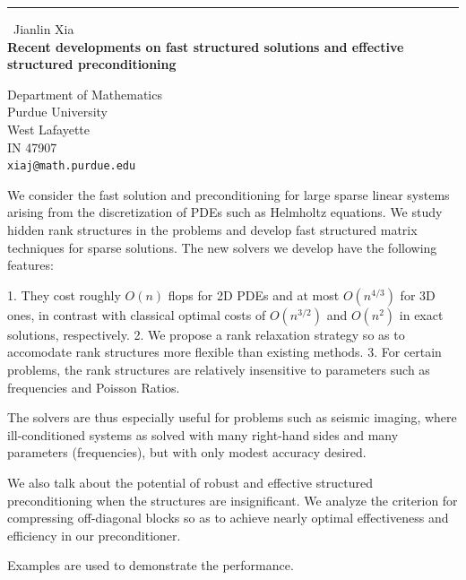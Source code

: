 \documentclass{report}
\begin{document}
\begin{center}
\rule{6in}{1pt} \
{\large Jianlin Xia \\
{\bf Recent developments on fast structured solutions and effective structured preconditioning}}

Department of Mathematics \\ Purdue University \\ West Lafayette \\ IN 47907
\\
{\tt xiaj@math.purdue.edu}\end{center}

We consider the fast solution and preconditioning for large
sparse linear systems arising from the discretization of PDEs
such as Helmholtz equations. We study hidden rank structures
in the problems and develop fast structured matrix techniques
for sparse solutions. The new solvers we develop have the
following features:

1. They cost roughly $O(n)$ flops for 2D PDEs and at most
$O(n^{4/3})$ for 3D ones, in contrast with classical optimal
costs of $O(n^{3/2})$ and $O(n^2)$ in exact solutions,
respectively.
2. We propose a rank relaxation strategy so as to accomodate
rank structures more flexible than existing methods.
3. For certain problems, the rank structures are relatively
insensitive to parameters such as frequencies and Poisson
Ratios.

The solvers are thus especially useful for problems such as
seismic imaging, where ill-conditioned systems as solved with
many right-hand sides and many parameters (frequencies),
but with only modest accuracy desired.

We also talk about the potential of robust and effective
structured preconditioning when the structures are
insignificant. We analyze the criterion for compressing
off-diagonal blocks so as to achieve nearly optimal
effectiveness and efficiency in our preconditioner.

Examples are used to demonstrate the performance.
\end{document}

